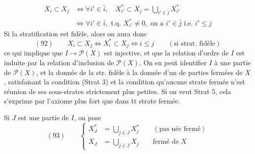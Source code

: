
\[
\begin{aligned}
X_i\subset X_j&\Longleftrightarrow\forall i'\in\bar i,\quad X_{i'}^*\subset X_j=\bigcup_{i'\in\bar j}X_{i'}^*\\
&\Longleftrightarrow\forall i'\in\bar i,\text{ t.q. }X_{i'}^*\neq0,\text{ on a }i'\in\bar j\text{ i.e. }i'\leq j
\end{aligned}
\]
Si la stratification est fidèle, alors on aura donc
\[
(92)\qquad X_i\subset X_j\Longleftrightarrow X_i^*\subset X_j\Longleftrightarrow i\leq j\qquad(\text{si strat. fidèle})
\]
ce qui implique que $I\longrightarrow\mathcal P(X)$ est injective, et que la relation d'ordre de $I$ est induite par la relation d'inclusion de $\mathcal P(X)$. On en peut identifier $I$ à une partie de $\mathcal P(X)$, et la donnée de la str. fidèle à la donnée d'un   de parties fermées  de $X$,  satisfaisant la condition (Strat 3)  et la condition qu'aucune strate fermée n'est réunion de ses sous-strates strictement plus petites. Si on veut Strat 5, cela s'exprime par l'axiome plus fort que dans tt strate fermée.

Si $J$ est une partie de $I$, on pose
\[
(93)\qquad\left\{
\begin{aligned}
X_J^*&=\bigcup_{j\in J}X_j^*\qquad(\text{pas néc fermé})\\
X_J&=\bigcup_{j\in J}X_j\qquad\text{fermé de }X
\end{aligned}\right.
\]
